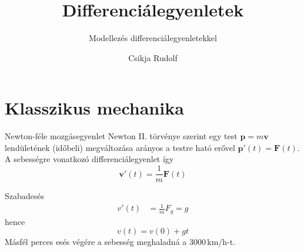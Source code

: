 \documentclass[10pt]{beamer}
\title{Differenciálegyenletek}
\subtitle{Modellezés differenciálegyenletekkel}
\date{}
\author{Csikja Rudolf}
\institute{Budapesti Műszaki és Gazdaságtudományi Egyetem\\Matemaikai Intézet, Analízis Tanszék}
\newcommand{\bp}[0]{\mathbf{p}}
\newcommand{\bv}[0]{\mathbf{v}}
\newcommand{\bF}[0]{\mathbf{F}}
\begin{document}
\maketitle



\section{Klasszikus mechanika}
\begin{frame}[t]{Newton-féle mozgásegyenlet}
Newton II. törvénye szerint egy test $\bp=m\bv$ lendületének (időbeli) megváltozása
arányos a testre ható erővel $\bp'(t) = \bF(t).$
A sebességre vonatkozó differenciálegyenlet így
\[\bv'(t) = \frac{1}{m}\bF(t)\]
\end{frame}

\begin{frame}[t]{Szabadesés}
\[
\begin{split}
v'(t)   &= \frac{1}{m}F_g = g
\end{split}
\]
hence
\[v(t) = v(0) + g t\]
Másfél perces esés végére a sebesség meghaladná a $3000\,$km/h-t.
\end{frame}
\end{document}
